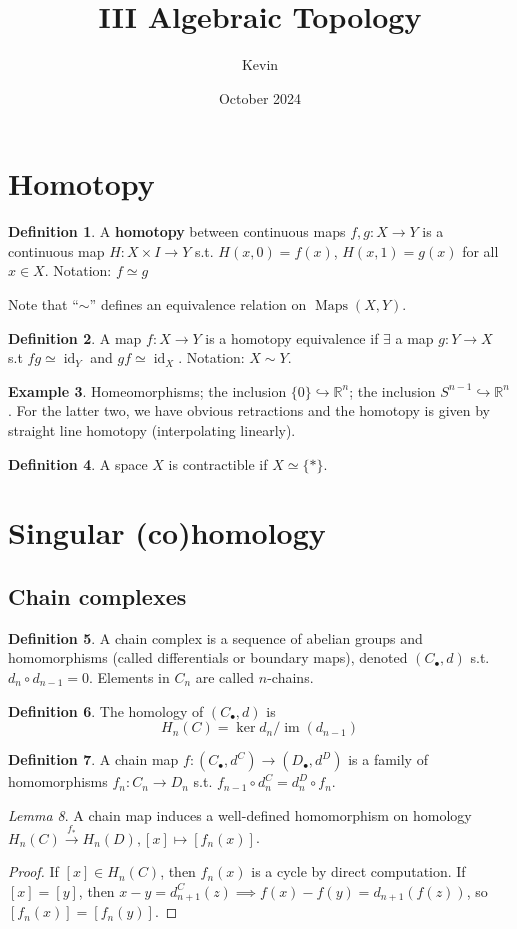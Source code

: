 \documentclass{article}
\title{III Algebraic Topology}
\author{Kevin}
\date{October 2024}
\theoremstyle{definition}
\newtheorem{defn}{Definition}[section]
\newtheorem{example}[defn]{Example}
\theoremstyle{remark}
\newtheorem{lem}[defn]{Lemma}
\theoremstyle{plain}
\newcommand{\RR}{\mathbb{R}}
\begin{document}
\maketitle

\section{Homotopy}
\begin{defn}
    A \textbf{homotopy} between continuous maps $f,g:X\to Y$ is a continuous map $H:X\times I\to Y$ s.t. $H(x,0)=f(x)$, $H(x,1)=g(x)$ for all $x\in X$. Notation: $f\simeq g$
\end{defn}
Note that ``$\sim$'' defines an equivalence relation on $\operatorname{Maps}(X,Y)$.
\begin{defn}
    A map $f:X\to Y$ is a homotopy equivalence if $\exists$ a map $g:Y\to X$ s.t $fg\simeq \operatorname{id}_Y$ and $gf\simeq \operatorname{id}_X$. Notation: $X\sim Y$.
\end{defn}
\begin{example}
    Homeomorphisms; the inclusion $\{0\}\hookrightarrow\RR^n$; the inclusion $S^{n-1}\hookrightarrow\RR^n$. For the latter two, we have obvious retractions and the homotopy is given by straight line homotopy (interpolating linearly).
\end{example}
\begin{defn}
    A space $X$ is contractible if $X\simeq \{\ast\}$.
\end{defn}

\section{Singular (co)homology}
\subsection{Chain complexes}
\begin{defn}
    A chain complex is a sequence of abelian groups and homomorphisms (called differentials or boundary maps), denoted $(C_\bullet,d)$ s.t. $d_n\circ d_{n-1}=0$. Elements in $C_n$ are called $n$-chains.
\end{defn}
\begin{defn}
    The homology of $(C_\bullet,d)$ is 
    \[H_n(C)=\ker d_n/\operatorname{im}(d_{n-1})\]
\end{defn}
\begin{defn}
    A chain map $f:(C_\bullet,d^C)\to(D_\bullet,d^D)$ is a family of homomorphisms $f_n:C_n\to D_n$ s.t. $f_{n-1}\circ d_n^C=d_{n}^D\circ f_n$.
\end{defn}
\begin{lem}
    A chain map induces a well-defined homomorphism on homology $H_n(C)\overset{f_\ast}{\to}H_n(D), [x]\mapsto[f_n(x)]$.
\end{lem}
\begin{proof}
If $[x]\in H_n(C)$, then $f_n(x)$ is a cycle by direct computation. If $[x]=[y]$, then $x-y=d_{n+1}^C(z)\implies f(x)-f(y)=d_{n+1}(f(z))$, so $[f_n(x)]=[f_n(y)]$.
\end{proof}
\end{document}
